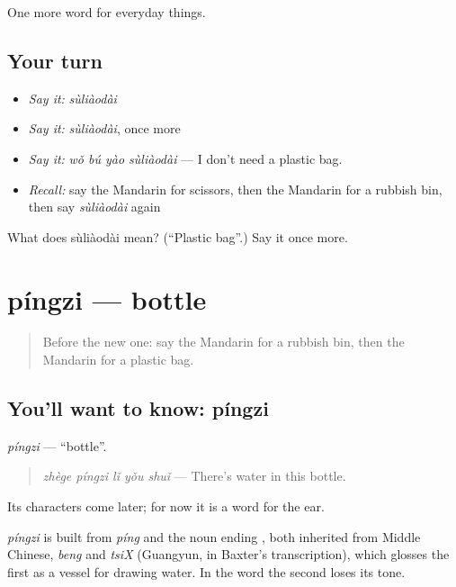 \begin{grammarlens}[title={What you've built}]
One more word for everyday things.
\end{grammarlens}

\subsection*{Your turn}
\begin{itemize}
\raggedright
  \item \emph{Say it:} \emph{sùliàodài}
  \item \emph{Say it:} \emph{sùliàodài}, once more
  \item \emph{Say it:} \emph{wǒ bú yào sùliàodài} — I don't need a plastic bag.
  \item \emph{Recall:} say the Mandarin for scissors, then the Mandarin for a rubbish bin, then say \emph{sùliàodài} again
\end{itemize}

\begin{tcolorbox}[breakable,colback=teal!4,colframe=teal!35!black,title={Before you move on}]
What does sùliàodài mean? (\textquotedblleft{}Plastic bag\textquotedblright{}.) Say it once more.
\end{tcolorbox}
\section[píngzi]{píngzi — bottle}

\label{lesson:ZH-C186-pingzi}



\begin{quote}
Before the new one: say the Mandarin for a rubbish bin, then the Mandarin for a plastic bag.
\end{quote}

\subsection*{You'll want to know: píngzi}
\emph{píngzi} — \textquotedblleft{}bottle\textquotedblright{}.

\begin{quote}
\emph{zhège píngzi lǐ yǒu shuǐ} — There's water in this bottle.
\end{quote}

Its characters come later; for now it is a word for the ear.

\begin{cousinweb}
\emph{píngzi} is built from \emph{píng} and the noun ending , both inherited from Middle Chinese, \emph{beng} and \emph{tsiX} (Guangyun, in Baxter's transcription), which glosses the first as a vessel for drawing water. In the word the second loses its tone.
\end{cousinweb}

